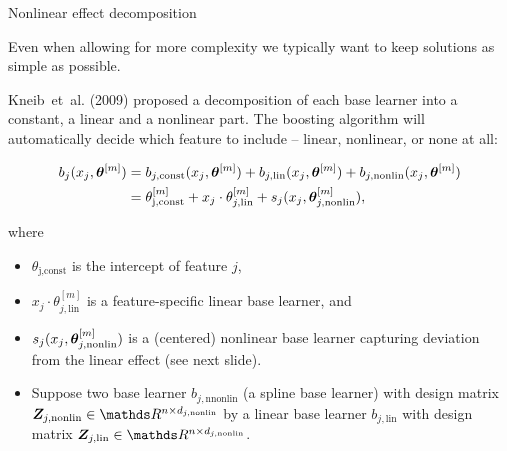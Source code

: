 \documentclass[11pt,compress,t,notes=noshow, xcolor=table]{beamer}
\begin{document}

%


\begin{vbframe}{Nonlinear effect decomposition}

Even when allowing for more complexity we typically want to keep solutions as
simple as possible.

\lz

Kneib~et~al. (2009) proposed a decomposition of each base learner into a
constant, a linear and a nonlinear part.
The boosting algorithm will automatically decide which feature to include --
linear, nonlinear, or none at all:

\vspace{-0.7cm}

\begin{align*}
b_j(x_j, \bm{\theta}^{[m]}) & = b_{j, \text{const}}(x_j, \bm{\theta}^{[m]}) + b_{j, \text{lin}}
(x_j, \bm{\theta}^{[m]}) + b_{j, \text{nonlin}}(x_j, \bm{\theta}^{[m]})\\
 & = \theta^{[m]}_\text{j,const} + x_j \cdot \theta^{[m]}_{j, \text{lin}} +
 s_j(x_j, \bm{\theta}^{[m]}_{j,\text{nonlin}}),
\end{align*}

\small
where
\begin{itemize}
  \small
  \item $\theta_\text{j,const}$ is the intercept of feature $j$,
  \item $x_j \cdot \theta^{[m]}_{j, \text{lin}}$ is a feature-specific linear
  base learner, and
  \item $s_j(x_j, \bm{\theta}^{[m]}_{j,\text{nonlin}})$ is a (centered) nonlinear base
  learner capturing deviation from the linear effect (see next slide).
\end{itemize}

\framebreak

\begin{itemize}
    \item 
        Suppose two base learner $b_{j,\text{nnonlin}}$ (a spline base learner) with design matrix $\bm{Z}_{j,\text{nonlin}}\in\R^{n\times d_{j,\text{nonlin}}}$ by a linear base learner $b_{j,\text{lin}}$ with design matrix $\bm{Z}_{j,\text{lin}}\in\R^{n\times d_{j,\text{nonlin}}}$.


\end{itemize}
\end{vbframe}
\end{document}
